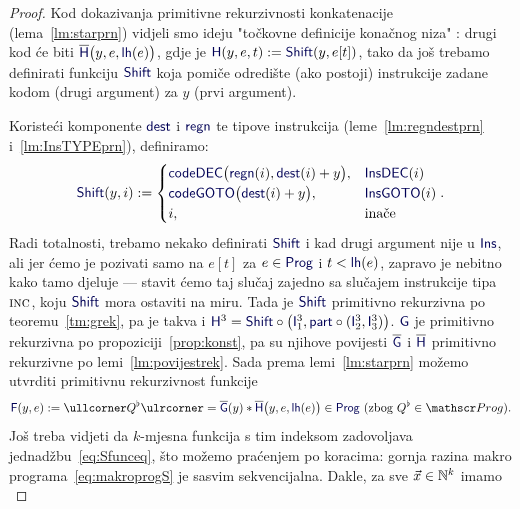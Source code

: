 \begin{proof}
Kod dokazivanja primitivne rekurzivnosti konkatenacije (lema~\ref{lm:starprn}) vidjeli smo ideju "točkovne definicije konačnog niza"%
: drugi kod će biti $\overline{\f H}\bigl(y,e,\f{lh}(e)\bigr)$, gdje je $\f H(y,e,t):=\f{Shift}(y,e[t])$, tako da još trebamo definirati funkciju $\f{Shift}$ koja pomiče odredište (ako postoji) instrukcije zadane kodom (drugi argument) za $y$ (prvi argument).

Koristeći komponente $\f{dest}$ i $\f{regn}$ te tipove instrukcija (leme~\ref{lm:regndestprn} i~\ref{lm:InsTYPEprn}), definiramo:
\begin{equation}
    \f{Shift}(y,i):=\begin{cases}
        \f{codeDEC}\bigl(\f{regn}(i),\f{dest}(i)+y\bigr),&\f{InsDEC}(i)\\
        \f{codeGOTO}\bigl(\f{dest}(i)+y\bigr),&\f{InsGOTO}(i)\\
        i,&\text{inače}
    \end{cases}\text.
\end{equation}
	Radi totalnosti, trebamo nekako definirati $\f{Shift}$ i kad drugi argument nije u $\f{Ins}$, ali jer ćemo je pozivati samo na $e[t]$ za $e\in\f{Prog}$ i $t<\f{lh}(e)$, zapravo je nebitno kako tamo djeluje --- stavit ćemo taj slučaj zajedno sa slučajem instrukcije tipa $\textsc{inc}$, koju $\f{Shift}$ mora ostaviti na miru. Tada je $\f{Shift}$ primitivno rekurzivna po teoremu~\ref{tm:grek}, pa je takva i $\f H^3=\f{Shift}\circ\bigl(\f I_1^3,\f{part}\circ(\f I_2^3,\f I_3^3)\bigr)$. $\f G$ je primitivno rekurzivna po propoziciji~\ref{prop:konst}, pa su njihove povijesti $\overline{\f G}$ i $\overline{\f H}$ primitivno rekurzivne po lemi~\ref{lm:povijestrek}. Sada prema lemi~\ref{lm:starprn} %
 možemo utvrditi primitivnu rekurzivnost funkcije
\begin{equation}
    \f F(y,e):=\kprog{Q^\flat}=\overline{\f G}(y)*\overline{\f H}\bigl(y,e,\f{lh}(e)\bigr)
	\in\f{Prog} \text{ (zbog $Q^\flat\in\mathscr Prog$).}
\end{equation}
Još treba vidjeti da $k$-mjesna funkcija s tim indeksom zadovoljava jednadžbu~\eqref{eq:Sfunceq}, što možemo praćenjem po koracima: gornja razina makro programa~\eqref{eq:makroprogS} je sasvim sekvencijalna. Dakle, za sve $\vec x\in{\mathbb N}^k$ imamo
	\vspace{-1em}
\begin{equation}

\end{equation}
\end{proof}
